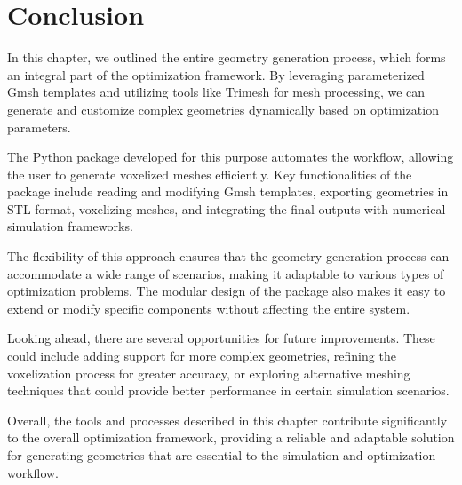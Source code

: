 \section{Conclusion}

In this chapter, we outlined the entire geometry generation process, which forms an integral part of the optimization framework. By leveraging parameterized Gmsh templates and utilizing tools like Trimesh for mesh processing, we can generate and customize complex geometries dynamically based on optimization parameters. 

The Python package developed for this purpose automates the workflow, allowing the user to generate voxelized meshes efficiently. Key functionalities of the package include reading and modifying Gmsh templates, exporting geometries in STL format, voxelizing meshes, and integrating the final outputs with numerical simulation frameworks.

The flexibility of this approach ensures that the geometry generation process can accommodate a wide range of scenarios, making it adaptable to various types of optimization problems. The modular design of the package also makes it easy to extend or modify specific components without affecting the entire system.

Looking ahead, there are several opportunities for future improvements. These could include adding support for more complex geometries, refining the voxelization process for greater accuracy, or exploring alternative meshing techniques that could provide better performance in certain simulation scenarios. 

Overall, the tools and processes described in this chapter contribute significantly to the overall optimization framework, providing a reliable and adaptable solution for generating geometries that are essential to the simulation and optimization workflow.

